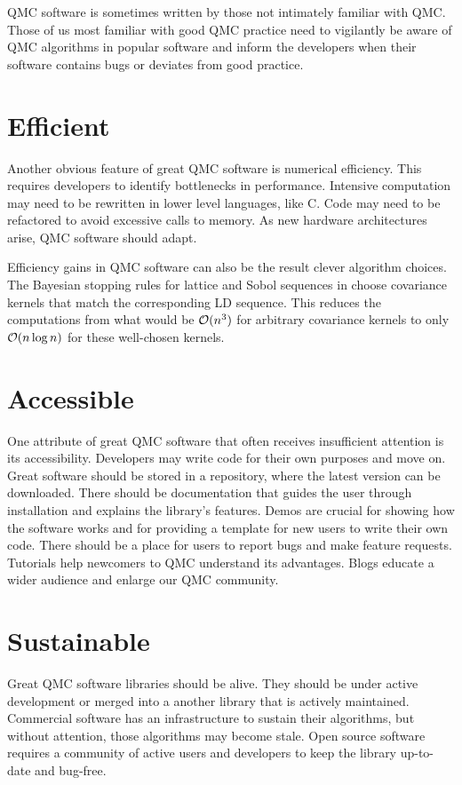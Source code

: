 \documentclass[graybox]{svmult}
\begin{document}
QMC software is sometimes written by those not intimately familiar with QMC.  Those of us most familiar with good QMC practice need to vigilantly be aware of QMC algorithms in popular software and inform the developers when their software contains bugs or deviates from good practice.

\section{Efficient} \label{CDHJS_sec:efficient}
Another obvious feature of great QMC software is numerical efficiency.  This requires developers to identify bottlenecks in performance.  Intensive computation may need to be rewritten in lower level languages, like C.  Code may need to be refactored to avoid excessive calls to memory.  As new hardware architectures arise, QMC software should adapt.  

Efficiency gains in QMC software can also be the result clever algorithm choices.  The Bayesian stopping rules for lattice and Sobol sequences in \cite{RatHic19a,JagHic22a} choose covariance kernels that match the corresponding LD sequence.  This reduces the computations from what would be ${\mathcal{O}}(n^3)$ for arbitrary covariance kernels to only ${\mathcal{O}}(n \log n)$ for these well-chosen kernels.

\section{Accessible} \label{CDHJS_sec:accessible}
One attribute of great QMC software that often receives insufficient attention is its accessibility.  Developers may write code for their own purposes and move on.  Great software should be stored in a repository, where the latest version can be downloaded.  There should be documentation that guides the user through installation and explains the library's features.  Demos are crucial for showing how the software works and for providing a template for new users to write their own code.  There should be a place for users to report bugs and make feature requests.  Tutorials help newcomers to QMC understand its advantages. Blogs educate a wider audience and enlarge our QMC community.  


\section{Sustainable} \label{CDHJS_sec:sustainable} 
Great QMC software libraries should be alive.  They should be under active development or merged into a another library that is actively maintained.  Commercial software has an infrastructure to sustain their algorithms, but without attention, those algorithms may become stale.  Open source software requires a community of active users and developers to keep the library up-to-date and bug-free.  
\end{document}
